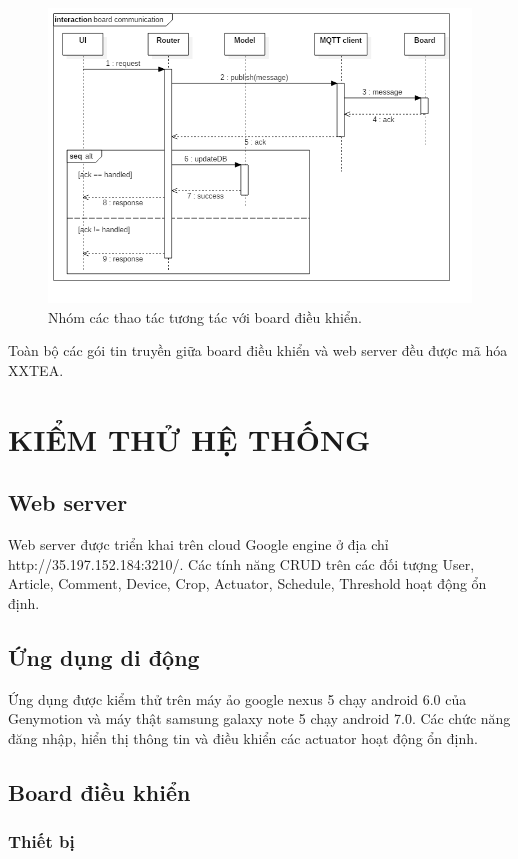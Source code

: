 \documentclass[a4paper,12pt,oneside]{article}
\begin{document}
\begin{figure}[H]
\begin{center}
\includegraphics[scale=.6]{hinh/seq-board-communication.png}
\end{center}
\caption{Nhóm các thao tác tương tác với board điều khiển.}
\end{figure}

\noindent Toàn bộ các gói tin truyền giữa board điều khiển và web server đều được mã hóa XXTEA.

\newpage
\section{KIỂM THỬ HỆ THỐNG}
\subsection{Web server}
Web server được triển khai trên cloud Google engine ở địa chỉ http://35.197.152.184:3210/. Các tính năng CRUD trên các đối tượng User, Article, Comment, Device, Crop, Actuator, Schedule, Threshold hoạt động ổn định. 
\subsection{Ứng dụng di động}
Ứng dụng được kiểm thử trên máy ảo google nexus 5 chạy android 6.0 của Genymotion và máy thật samsung galaxy note 5 chạy android 7.0. Các chức năng đăng nhập, hiển thị thông tin và điều khiển các actuator hoạt động ổn định.
\subsection{Board điều khiển}
\subsubsection{Thiết bị}
\end{document}
